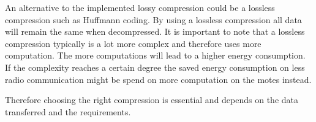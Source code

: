 An alternative to the implemented lossy compression could be a lossless compression such as Huffmann coding. By using a lossless compression all data will remain the same when decompressed. It is important to note that a lossless compression typically is a lot more complex and therefore uses more computation. The more computations will lead to a higher energy consumption. If the complexity reaches a certain degree the saved energy consumption on less radio communication might be spend on more computation on the motes instead.

Therefore choosing the right compression is essential and depends on the data transferred and the requirements.


